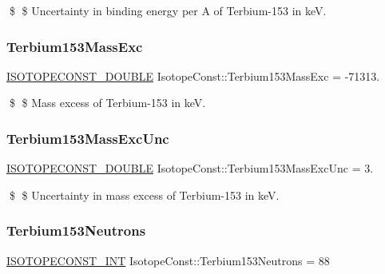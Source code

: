 \$ \$ Uncertainty in binding energy per A of Terbium-\/153 in keV. \mbox{\label{group___isotope_const-_terbium-_tb153_ga397c663f1af44ec1fc75a04fa238c092}} 
\subsubsection{\texorpdfstring{Terbium153\+Mass\+Exc}{Terbium153MassExc}}
{\footnotesize\ttfamily \mbox{\hyperlink{group___isotope_const-_macros_ga8f45a7272ce02c0b4c65c44636ed719a}{I\+S\+O\+T\+O\+P\+E\+C\+O\+N\+S\+T\+\_\+\+D\+O\+U\+B\+LE}} Isotope\+Const\+::\+Terbium153\+Mass\+Exc = -\/71313.}

\$ \$ Mass excess of Terbium-\/153 in keV. \mbox{\label{group___isotope_const-_terbium-_tb153_gacd560cf904de02123cb1c272717abc48}} 
\subsubsection{\texorpdfstring{Terbium153\+Mass\+Exc\+Unc}{Terbium153MassExcUnc}}
{\footnotesize\ttfamily \mbox{\hyperlink{group___isotope_const-_macros_ga8f45a7272ce02c0b4c65c44636ed719a}{I\+S\+O\+T\+O\+P\+E\+C\+O\+N\+S\+T\+\_\+\+D\+O\+U\+B\+LE}} Isotope\+Const\+::\+Terbium153\+Mass\+Exc\+Unc = 3.}

\$ \$ Uncertainty in mass excess of Terbium-\/153 in keV. \mbox{\label{group___isotope_const-_terbium-_tb153_ga1f2bad8e3f1b81eeb6d7865c8cabf596}} 
\subsubsection{\texorpdfstring{Terbium153\+Neutrons}{Terbium153Neutrons}}
{\footnotesize\ttfamily \mbox{\hyperlink{group___isotope_const-_macros_ga5f18360b3e99483a35c32d789e62621c}{I\+S\+O\+T\+O\+P\+E\+C\+O\+N\+S\+T\+\_\+\+I\+NT}} Isotope\+Const\+::\+Terbium153\+Neutrons = 88}

